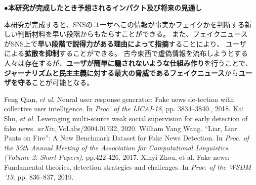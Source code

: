 {	\noindent
	●\textbf{本研究が完成したとき予想されるインパクト及び将来の見通し}

	本研究が完成すると、SNSのユーザへこの情報が事実かフェイクかを判断する新しい判断材料を早い段階からもたらすことができる。
	また、フェイクニュースがSNS上で\textbf{早い段階で説得力がある理由によって指摘}することにより、
	ユーザによる\textbf{拡散を抑制}することができる。
	古今東西で虚偽情報を流布しようとする人々は存在するが、\textbf{ユーザが簡単に騙されないような仕組み作り}を行うことで、
	\textbf{ジャーナリズムと民主主義に対する最大の脅威であるフェイクニュース}\cite{zhou2019wsdm}から\textbf{ユーザを守る}ことが可能となる。
	
	\vspace*{-1mm}

	{\footnotesize
		\begin{thebibliography}{99}
			\setcounter{enumiv}{8}
			\vspace*{-2mm}
			\setlength{\parskip}{0cm}
			\setlength{\itemsep}{0cm}
			\begin{spacing}{0.7}
				 Feng Qian, \textit{et al.} Neural user response generator: Fake news de-tection with collective user intelligence. In \textit{Proc. of the IJCAI-18}, pp. 3834–3840., 2018.
				 Kai Shu, \textit{et al.} Leveraging multi-source weak social supervision for early detection of fake news. \textit{arXiv}, Vol.abs/2004.01732, 2020.
				William Yang Wang. ``Liar, Liar Pants on Fire'': A New Benchmark Dataset for Fake News Detection. In \textit{Proc. of the 55th Annual Meeting of the Association for Computational Linguistics (Volume 2: Short Papers)}, pp.422-426, 2017.
				Xinyi Zhou, et al. Fake news: Fundamental theories, detection strategies and challenges. In \textit{Proc. of the WSDM '19}, pp. 836–837, 2019.
			\end{spacing}
		\end{thebibliography}
	}
}

